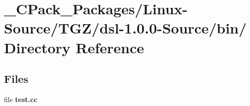 \section{\_\-CPack\_\-Packages/Linux-\/Source/TGZ/dsl-\/1.0.0-\/Source/bin/ Directory Reference}
\label{dir_762c27bfb88230ae3e669337fdf8ccf6}
\subsection*{Files}
\begin{DoxyCompactItemize}
\item 
file {\bf test.cc}
\end{DoxyCompactItemize}
